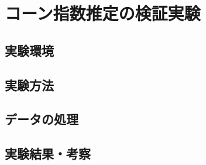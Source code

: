 \documentclass[../main]{subfiles}
\begin{document}
\graphicspath{{../figures/chap4/}}

\section{コーン指数推定の検証実験}
\label{sec:vexp_cone-index}

\subsection{実験環境}
\label{subsec:vexp_ci_environment}

\subsection{実験方法}
\label{subsec:vexp_ci_method}

\subsection{データの処理}
\label{subsec:vexp_ci_processing}

\subsection{実験結果・考察}
\label{subsec:vexp_ci_result}
\end{document}
